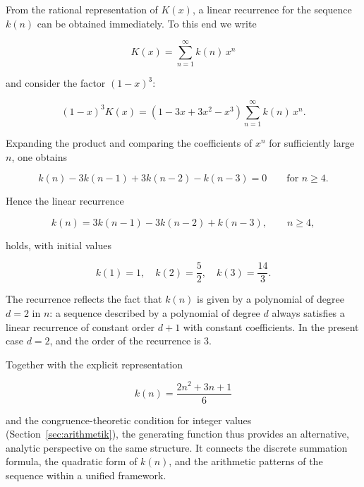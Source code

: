 From the rational representation of $K(x)$, a linear recurrence for the sequence $k(n)$ can be obtained immediately. To this end we write


\[
  K(x) = \sum_{n=1}^{\infty} k(n)\,x^{n}
\]


and consider the factor $(1-x)^{3}$:


\[
  (1-x)^{3} K(x)
  = (1 - 3x + 3x^{2} - x^{3}) \sum_{n=1}^{\infty} k(n)\,x^{n}.
\]


Expanding the product and comparing the coefficients of $x^{n}$ for sufficiently large $n$, one obtains


\[
  k(n) - 3k(n-1) + 3k(n-2) - k(n-3) = 0 \qquad \text{for } n \ge 4.
\]


Hence the linear recurrence


\[
  k(n) = 3k(n-1) - 3k(n-2) + k(n-3), \qquad n \ge 4,
\]


holds, with initial values


\[
  k(1) = 1,\quad k(2) = \frac{5}{2},\quad k(3) = \frac{14}{3}.
\]



\begin{bemerkung}
The recurrence reflects the fact that $k(n)$ is given by a polynomial of degree $d = 2$ in $n$: a sequence described by a polynomial of degree $d$ always satisfies a linear recurrence of constant order $d+1$ with constant coefficients. In the present case $d=2$, and the order of the recurrence is $3$.

Together with the explicit representation


\[
  k(n) = \frac{2n^{2} + 3n + 1}{6}
\]


and the congruence-theoretic condition for integer values (Section~\ref{sec:arithmetik}), the generating function thus provides an alternative, analytic perspective on the same structure. It connects the discrete summation formula, the quadratic form of $k(n)$, and the arithmetic patterns of the sequence within a unified framework.
\end{bemerkung}
